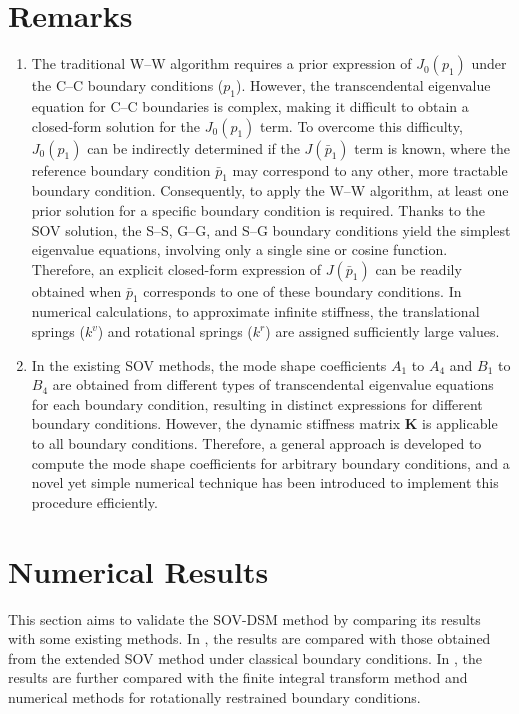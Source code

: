 \documentclass[preprint,12pt,number]{elsarticle}
\begin{document}
\section*{Remarks}
\begin{enumerate}[label=(\roman*)]
	\item The traditional W–W algorithm requires a prior expression of $J_0(p_1)$ under the C–C boundary conditions ($p_1$).  
	However, the transcendental eigenvalue equation for C–C boundaries is complex, making it difficult to obtain a closed-form solution for the $J_0(p_1)$ term.  
	To overcome this difficulty, $J_0(p_1)$ can be indirectly determined if the $J(\bar{p}_1)$ term is known,  
	where the reference boundary condition $\bar{p}_1$ may correspond to any other, more tractable boundary condition.  
	Consequently, to apply the W–W algorithm, at least one prior solution for a specific boundary condition is required.  	
	Thanks to the SOV solution, the S–S, G–G, and S–G boundary conditions yield the simplest eigenvalue equations, involving only a single sine or cosine function.  
	Therefore, an explicit closed-form expression of $J(\bar{p}_1)$ can be readily obtained when $\bar{p}_1$ corresponds to one of these boundary conditions.  	
	In numerical calculations, to approximate infinite stiffness, the translational springs ($k^v$) and rotational springs ($k^r$) are assigned sufficiently large values.
	
	\item In the existing SOV methods, the mode shape coefficients $A_1$ to $A_4$ and $B_1$ to $B_4$ are obtained from different types of transcendental eigenvalue equations for each boundary condition, resulting in distinct expressions for different boundary conditions.  
	However, the dynamic stiffness matrix $\mathbf{K}$ is applicable to all boundary conditions.  
	Therefore, a general approach is developed to compute the mode shape coefficients for arbitrary boundary conditions,  
	and a novel yet simple numerical technique has been introduced to implement this procedure efficiently.
	
	
\end{enumerate}


\FloatBarrier
\section{Numerical Results}\label{sec:NR}  
This section aims to validate the SOV-DSM method by comparing its results with some existing methods.  
In , the results are compared with those obtained from the extended SOV method under classical boundary conditions.  
In , the results are further compared with the finite integral transform method and numerical methods for rotationally restrained boundary conditions.
\end{document}
